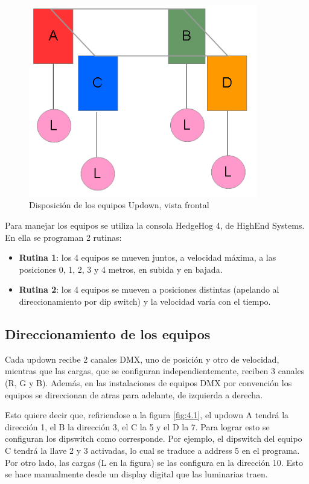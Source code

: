 \begin{figure}[!ht]
	\centering
	\includegraphics[width=10cm,scale=1]{resources/4_1-disposicionUpdowns.png}
	\caption{Disposición de los equipos Updown, vista frontal}
	\label{fig:\thefigure}
\end{figure}

Para manejar los equipos se utiliza la consola HedgeHog 4, de HighEnd Systems. En ella se programan 2 rutinas:
\begin{itemize}
	\item \textbf{Rutina 1}: los 4 equipos se mueven juntos, a velocidad máxima, a las posiciones 0, 1, 2, 3 y 4 metros, en subida y en bajada.
	\item \textbf{Rutina 2}: los 4 equipos se mueven a posiciones distintas (apelando al direccionamiento por dip switch) y la velocidad varía con el tiempo.
\end{itemize}

\subsection{Direccionamiento de los equipos}
Cada updown recibe 2 canales DMX, uno de posición y otro de velocidad, mientras que las cargas, que se configuran independientemente, reciben 3 canales (R, G y B). Además, en las instalaciones de equipos DMX por convención los equipos se direccionan de atras para adelante, de izquierda a derecha.

Esto quiere decir que, refiriendose a la figura \ref{fig:4.1}, el updown A tendrá la dirección 1, el B la dirección 3, el C la 5 y el D la 7. Para lograr esto se configuran los dipswitch como corresponde. Por ejemplo, el dipswitch del equipo C tendrá la llave 2 y 3 activadas, lo cual se traduce a address 5 en el programa.\\
Por otro lado, las cargas (L en la figura) se las configura en la dirección 10. Esto se hace manualmente desde un display digital que las luminarias traen. 


